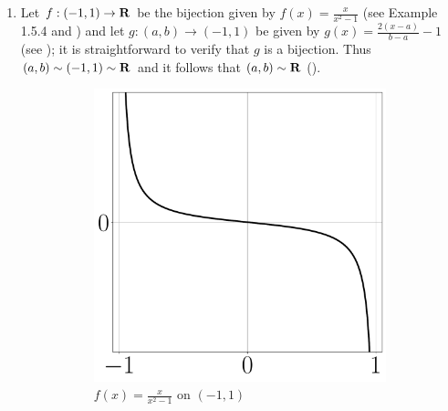\documentclass{lew98_solutions}
\begin{document}
\begin{solution}
    \begin{enumerate}
        \item Let \( f : (-1, 1) \to \mathbf{R} \) be the bijection given by \( f(x) = \tfrac{x}{x^2 - 1} \) (see Example 1.5.4 and ) and let \( g : (a, b) \to (-1, 1) \) be given by \( g(x) = \tfrac{2(x - a)}{b - a} - 1 \) (see ); it is straightforward to verify that \( g \) is a bijection. Thus \( (a, b) \sim (-1, 1) \sim \mathbf{R} \) and it follows that \( (a, b) \sim \mathbf{R} \) ().

        \begin{figure}[t]
            \centering
            \begin{subfigure}{0.42\textwidth}
                \includegraphics[width=\textwidth]{UA_Figures/UA_ex1_5_4_fig_1_a.pdf}
                \caption{\( f(x) = \tfrac{x}{x^2 - 1} \) on \( (-1, 1) \)}
            \end{subfigure}
            \begin{subfigure}{0.42\textwidth}

\end{subfigure}
\end{figure}
\end{enumerate}
\end{solution}
\end{document}
